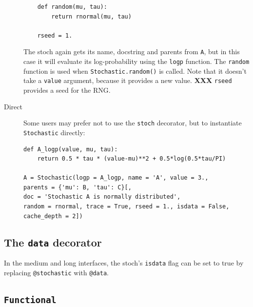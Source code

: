 \documentclass[]{book}
\begin{document}
\begin{description}
\begin{verbatim}
    def random(mu, tau):
        return rnormal(mu, tau)

    rseed = 1.
    \end{verbatim}
The stoch again gets its name, docstring and parents from \texttt{A}, but in this case it will evaluate its log-probability using the \texttt{logp} function. The \texttt{random} function is used when \texttt{Stochastic.random()} is called. Note that it doesn't take a \texttt{value} argument, because it provides a new value. \textbf{XXX} \texttt{rseed} provides a seed for the RNG.

    \item[Direct] Some users may prefer not to use the \texttt{stoch} decorator, but to instantiate \texttt{Stochastic} directly:
\begin{verbatim}
def A_logp(value, mu, tau):
    return 0.5 * tau * (value-mu)**2 + 0.5*log(0.5*tau/PI)

A = Stochastic(logp = A_logp, name = 'A', value = 3.,
parents = {'mu': B, 'tau': C}[,
doc = 'Stochastic A is normally distributed',
random = rnormal, trace = True, rseed = 1., isdata = False,
cache_depth = 2])
\end{verbatim}
\end{description}



\subsection{The \texttt{data} decorator}\label{sub:@data}
In the medium and long interfaces, the stoch's \texttt{isdata} flag can be set to true by replacing \texttt{@stochastic} with \texttt{@data}.


\subsection{\texttt{Functional}}\label{sub:functl}
\end{document}
